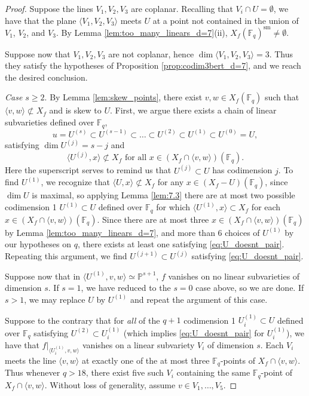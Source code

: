 \documentclass{amsart}
\newcommand{\F}{\mathbb{F}}
\renewcommand{\P}{\mathbb{P}}
\newcommand{\Span}[1]{\langle #1 \rangle}
\newcommand{\sm}{\mathrm{sm}}
\theoremstyle{definition}
\numberwithin{equation}{section}
\numberwithin{table}{section}
\newcommand{\qbound}[1]{{\color{cyan}$q > {#1}$}}
\renewcommand{\qbound}[1]{{$q > {#1}$}}
\begin{document}
\begin{proof}
    Suppose the lines $V_1,V_2,V_3$ are coplanar. Recalling that $V_i \cap U = \emptyset$, we have that the plane $\Span{V_1,V_2,V_3}$ meets $U$ at a point not contained in the union of $V_1$, $V_2$, and $V_3$. By Lemma \ref{lem:too_many_linears_d=7}(ii), $X_f(\F_q)^{\sm} \neq \emptyset$.

    Suppose now that $V_1,V_2,V_3$ are not coplanar, hence $\dim \Span{V_1,V_2,V_3} = 3$. Thus they satisfy the hypotheses of Proposition \ref{prop:codim3bert_d=7}, and we reach the desired conclusion.
        
    \bigskip\noindent\textit{Case $s\geq 2$}. By Lemma \ref{lem:skew_points}, there exist $v,w \in X_f(\F_q)$ such that $\Span{v,w} \not\subset X_f$ and is skew to $U$. First, we argue there exists a chain of linear subvarieties defined over $\F_q$,
    \[u = U^{(s)} \subset U^{(s-1)} \subset \ldots \subset U^{(2)} \subset U^{(1)} \subset U^{(0)} = U,\]
    satisfying $\dim U^{(j)} = s-j$ and
    \begin{equation}\label{eq:U_doesnt_pair}
        \Span{U^{(j)}, x} \not\subset X_f \text{ for all } x \in (X_f \cap \Span{v,w})(\F_q).
    \end{equation}
    Here the superscript serves to remind us that $U^{(j)} \subset U$ has codimension $j$. To find $U^{(1)}$, we recognize that $\Span{U,x} \not\subset X_f$ for any $x \in (X_f - U)(\F_q)$, since $\dim U$ is maximal, so applying Lemma \ref{lem:7.3} there are at most two possible codimension 1 $U^{(1)} \subset U$ defined over $\F_q$ for which $\Span{U^{(1)}, x} \subset X_f$ for each $x \in (X_f \cap \Span{v,w})(\F_q)$. Since there are at most three $x \in (X_f \cap \Span{v,w})(\F_q)$ by Lemma \ref{lem:too_many_linears_d=7}, and more than 6 choices of $U^{(1)}$ by our hypotheses on $q$, there exists at least one satisfying \eqref{eq:U_doesnt_pair}. Repeating this argument, we find $U^{(j+1)} \subset U^{(j)}$ satisfying \eqref{eq:U_doesnt_pair}.

    Suppose now that in $\Span{U^{(1)}, v,w} \simeq \P^{s+1}$, $f$ vanishes on no linear subvarieties of dimension $s$. If $s=1$, we have reduced to the $s=0$ case above, so we are done. If $s > 1$, we may replace $U$ by $U^{(1)}$ and repeat the argument of this case.
    
    Suppose to the contrary that for \textit{all} of the $q+1$ codimension 1 $U_i^{(1)} \subset U$ defined over $\F_q$ satisfying $U^{(2)} \subset U_i^{(1)}$ (which implies \eqref{eq:U_doesnt_pair} for $U_i^{(1)}$), we have that $f|_{\Span{U_i^{(1)}, v, w}}$ vanishes on a linear subvariety $V_i$ of dimension $s$. Each $V_i$ meets the line $\Span{v,w}$ at exactly one of the at most three $\F_q$-points of $X_f \cap \Span{v,w}$. Thus whenever \qbound{18}, there exist five such $V_i$ containing the same $\F_q$-point of $X_f \cap \Span{v,w}$. Without loss of generality, assume $v \in V_1, \ldots, V_5$. 


\end{proof}
\end{document}
